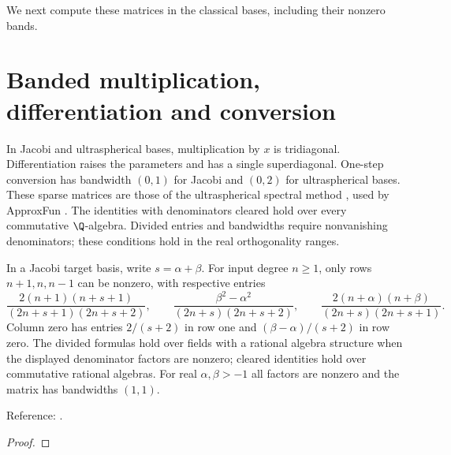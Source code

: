 We next compute these matrices in the classical bases, including their
nonzero bands.

\chapter{Banded multiplication, differentiation and conversion}\label{chap:banded}

In Jacobi and ultraspherical bases, multiplication by $x$ is tridiagonal.
Differentiation raises the parameters and has a single superdiagonal.
One-step conversion has bandwidth $(0,1)$ for Jacobi and $(0,2)$ for
ultraspherical bases. These sparse matrices are those of the ultraspherical spectral
method \cite{olver-townsend}, used by ApproxFun \cite{approxfun-jl}. The
identities with denominators cleared hold over every commutative
$\Q$-algebra. Divided entries and bandwidths require nonvanishing denominators;
these conditions hold in the real orthogonality ranges.

\begin{theorem}
\label{thm:jacobi-multiplication-matrix}
\leanok
In a Jacobi target basis, write $s=\alpha+\beta$. For input degree $n\ge1$,
only rows $n+1,n,n-1$ can be nonzero, with respective entries
\[\frac{2(n+1)(n+s+1)}{(2n+s+1)(2n+s+2)},\qquad
\frac{\beta^2-\alpha^2}{(2n+s)(2n+s+2)},\qquad
\frac{2(n+\alpha)(n+\beta)}{(2n+s)(2n+s+1)}.\]
Column zero has entries $2/(s+2)$ in row one and $(\beta-\alpha)/(s+2)$ in row zero.
The divided formulas hold over fields with a rational algebra structure when
the displayed denominator factors are nonzero; cleared identities hold over
commutative rational algebras. For real $\alpha,\beta>-1$ all factors are
nonzero and the matrix has bandwidths $(1,1)$.

Reference: \cite[18.9.1--18.9.2]{dlmf}.
\end{theorem}
\begin{proof}
\leanok
\end{proof}

